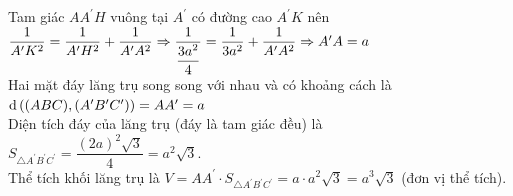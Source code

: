 \begin{ex}
{\begin{itemchoice}
		Tam giác $ A{A^\prime}H$ vuông tại $A^\prime$ có đường cao $A^\prime  K$ nên\\
		$\dfrac{1}{A^\prime{K^2}}=\dfrac{1}{A^\prime{H^2}}+\dfrac{1}{A^\prime{A^2}}\Rightarrow\dfrac{1}{\dfrac{3a^2}{4}}=\dfrac{1}{3a^2}+\dfrac{1}{A^\prime{A^2}}\Rightarrow{A^\prime}A=a{\rm}$\\ 
		Hai mặt đáy lăng trụ song song với  nhau và có khoảng cách là $ \mathrm{d}\left((ABC),\left(A^\prime{B^\prime}{C^\prime}\right)\right)=A{A^\prime}=a{\rm}$\\
		Diện tích đáy của lăng trụ (đáy là tam giác đều) là $S_{\triangle{A^\prime}{B^\prime}{C^\prime}}=\dfrac{(2a)^2\sqrt  3}{4}=a^2\sqrt 3 $.\\
		\itemch Thể tích khối lăng trụ  là $ V=A{A^\prime}\cdot{S_{\triangle{A^\prime}{B^\prime}{C^\prime}}}=a\cdot{a^2}\sqrt 3=a^3\sqrt 3 $ (đơn vị thể tích).
	\end{itemchoice}
	 }
\end{ex}

